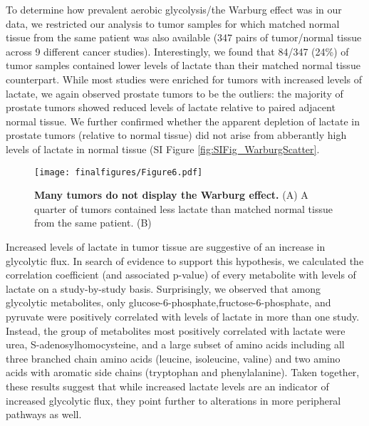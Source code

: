 \documentclass[10pt]{article}
\begin{document}
To determine how prevalent aerobic glycolysis/the Warburg effect was in our data, we restricted our analysis to tumor samples for which matched normal tissue from the same patient was also available (347 pairs of tumor/normal tissue across 9 different cancer studies). Interestingly, we found that 84/347 (24\%) of tumor samples contained lower levels of lactate than their matched normal tissue counterpart. While most studies were enriched for tumors with increased levels of lactate, we again observed prostate tumors to be the outliers: the majority of prostate tumors showed reduced levels of lactate relative to paired adjacent normal tissue. We further confirmed whether the apparent depletion of lactate in prostate tumors (relative to normal tissue) did not arise from abberantly high levels of lactate in normal tissue (SI Figure \ref{fig:SIFig_WarburgScatter}. 

\begin{figure}[ht!]
  \centering
     \texttt{[image: finalfigures/Figure6.pdf]}
  \caption{\textbf{Many tumors do not display the Warburg effect.} (A) A quarter of tumors contained less lactate than matched normal tissue from the same patient. (B) }
     \label{fig:Fig6}
\end{figure}

Increased levels of lactate in tumor tissue are suggestive of an increase in glycolytic flux. In search of evidence to support this hypothesis, we calculated the correlation coefficient (and associated p-value) of every metabolite with levels of lactate on a study-by-study basis. Surprisingly, we observed that among glycolytic metabolites, only glucose-6-phosphate,fructose-6-phosphate, and pyruvate were positively correlated with levels of lactate in more than one study. Instead, the group of metabolites most positively correlated with lactate were urea, S-adenosylhomocysteine, and a large subset of amino acids including all three branched chain amino acids (leucine, isoleucine, valine) and two amino acids with aromatic side chains (tryptophan and phenylalanine). Taken together, these results suggest that while increased lactate levels are an indicator of increased glycolytic flux, they point further to alterations in more peripheral pathways as well.
\end{document}
